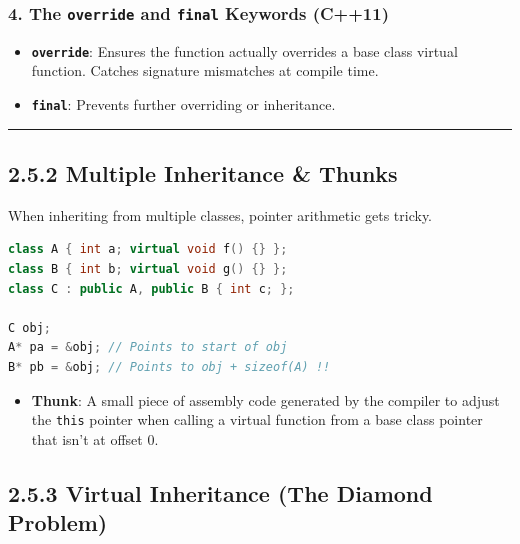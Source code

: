 \hypertarget{the-override-and-final-keywords-c11}{%
\subsubsection{\texorpdfstring{4. The \texttt{override} and
\texttt{final} Keywords
(C++11)}{4. The override and final Keywords (C++11)}}\label{the-override-and-final-keywords-c11}}

\begin{itemize}
\tightlist
\item
  \textbf{\passthrough{\lstinline!override!}}: Ensures the function
  actually overrides a base class virtual function. Catches signature
  mismatches at compile time.
\item
  \textbf{\passthrough{\lstinline!final!}}: Prevents further overriding
  or inheritance.
\end{itemize}

\begin{center}\rule{0.5\linewidth}{0.5pt}\end{center}

\hypertarget{multiple-inheritance-thunks}{%
\subsection{2.5.2 Multiple Inheritance \&
Thunks}\label{multiple-inheritance-thunks}}

When inheriting from multiple classes, pointer arithmetic gets tricky.

\begin{lstlisting}[language={C++}]
class A { int a; virtual void f() {} };
class B { int b; virtual void g() {} };
class C : public A, public B { int c; };

C obj;
A* pa = &obj; // Points to start of obj
B* pb = &obj; // Points to obj + sizeof(A) !!
\end{lstlisting}

\begin{itemize}
\tightlist
\item
  \textbf{Thunk}: A small piece of assembly code generated by the
  compiler to adjust the \passthrough{\lstinline!this!} pointer when
  calling a virtual function from a base class pointer that isn't at
  offset 0.
\end{itemize}

\hypertarget{virtual-inheritance-the-diamond-problem}{%
\subsection{2.5.3 Virtual Inheritance (The Diamond
Problem)}\label{virtual-inheritance-the-diamond-problem}}

